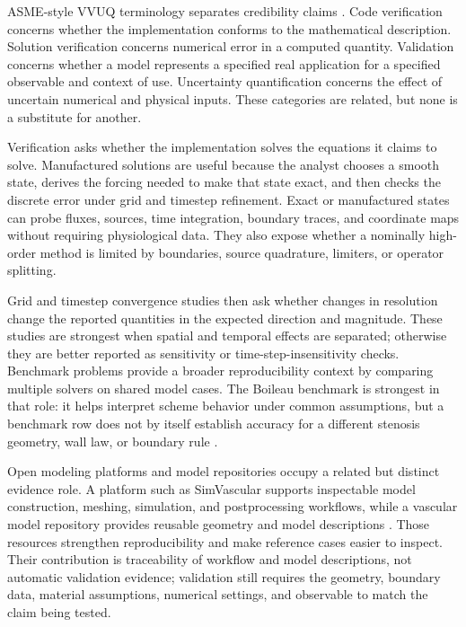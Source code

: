 ASME-style VVUQ terminology separates credibility claims
\cite{ASME2022VVUQTerminology}. Code verification concerns whether the
implementation conforms to the mathematical description. Solution verification
concerns numerical error in a computed quantity. Validation concerns whether a
model represents a specified real application for a specified observable and
context of use. Uncertainty quantification concerns the effect of uncertain
numerical and physical inputs. These categories are related, but none is a
substitute for another.

Verification asks whether the implementation solves the equations it claims to
solve. Manufactured solutions are useful because the analyst chooses a smooth
state, derives the forcing needed to make that state exact, and then checks the
discrete error under grid and timestep refinement. Exact or manufactured states
can probe fluxes, sources, time integration, boundary traces, and coordinate
maps without requiring physiological data. They also expose whether a nominally
high-order method is limited by boundaries, source quadrature, limiters, or
operator splitting.

Grid and timestep convergence studies then ask whether changes in resolution
change the reported quantities in the expected direction and magnitude. These
studies are strongest when spatial and temporal effects are separated; otherwise
they are better reported as sensitivity or time-step-insensitivity checks.
Benchmark problems provide a broader reproducibility context by comparing
multiple solvers on shared model cases. The Boileau benchmark is strongest in
that role: it helps interpret scheme behavior under common assumptions, but a
benchmark row does not by itself establish accuracy for a different stenosis
geometry, wall law, or boundary rule \cite{BoileauEtAl2015Benchmark}.

Open modeling platforms and model repositories occupy a related but distinct
evidence role. A platform such as SimVascular supports inspectable model
construction, meshing, simulation, and postprocessing workflows, while a
vascular model repository provides reusable geometry and model descriptions
\cite{SimVascular2026Platform,SimVascular2026VascularModelRepository}. Those
resources strengthen reproducibility and make reference cases easier to inspect.
Their contribution is traceability of workflow and model descriptions, not automatic
validation evidence; validation still requires the geometry, boundary data,
material assumptions, numerical settings, and observable to match the claim
being tested.

